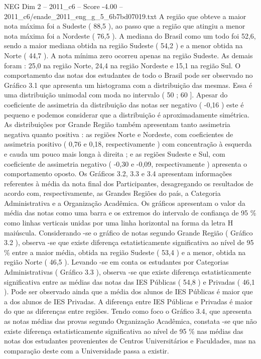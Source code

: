 \begin{textsample}{NEG Dim 2 – 2011\_c6 – Score -4.00 – 2011\_c6/enade\_2011\_eng\_g\_5\_6b7bd07019.txt}
A região que obteve a maior nota máxima foi a Sudeste ( 88,5 ), ao passo que a região que atingiu a menor nota máxima foi a Nordeste ( 76,5 ).
A mediana do Brasil como um todo foi 52,6, sendo a maior mediana obtida na região Sudeste ( 54,2 ) e a menor obtida na Norte ( 44,7 ).
A nota mínima zero ocorreu apenas na região Sudeste.
As demais foram : 25,0 na região Norte, 24,4 na região Nordeste e 15,1 na região Sul.
O comportamento das notas dos estudantes de todo o Brasil pode ser observado no Gráfico 3.1 que apresenta um histograma com a distribuição das mesmas.
Essa é uma distribuição unimodal com moda no intervalo ( 50 ; 60 ].
Apesar do coeficiente de assimetria da distribuição das notas ser negativo ( -0,16 ) este é pequeno e podemos considerar que a distribuição é aproximadamente simétrica.
As distribuições por Grande Região também apresentam tanto assimetria negativa quanto positiva : as regiões Norte e Nordeste, com coeficientes de assimetria positivo ( 0,76 e 0,18, respectivamente ) com concentração à esquerda e cauda um pouco mais longa à direita ; e as regiões Sudeste e Sul, com coeficiente de assimetria negativo ( -0,30 e -0,09, respectivamente ) apresenta o comportamento oposto.
Os Gráficos 3.2, 3.3 e 3.4 apresentam informações referentes à média da nota final dos Participantes, desagregando os resultados de acordo com, respectivamente, as Grandes Regiões do país, a Categoria Administrativa e a Organização Acadêmica.
Os gráficos apresentam o valor da média das notas como uma barra e os extremos do intervalo de confiança de 95 \% como linhas verticais unidas por uma linha horizontal na forma da letra H maiúscula.
Considerando -se o gráfico de notas segundo Grande Região ( Gráfico 3.2 ), observa -se que existe diferença estatisticamente significativa ao nível de 95 \% entre a maior média, obtida na região Sudeste ( 53,4 ) e a menor, obtida na região Norte ( 46,5 ).
Levando -se em conta os estudantes por Categorias Administrativas ( Gráfico 3.3 ), observa -se que existe diferença estatisticamente significativa entre as médias das notas das IES Públicas ( 54,8 ) e Privadas ( 46,1 ).
Pode ser observado ainda que a média dos alunos de IES Públicas é maior que a dos alunos de IES Privadas.
A diferença entre IES Públicas e Privadas é maior do que as diferenças entre regiões.
Tendo como foco o Gráfico 3.4, que apresenta as notas médias das provas segundo Organização Acadêmica, constata -se que não existe diferença estatisticamente significativa ao nível de 95 \% nas médias das notas dos estudantes provenientes de Centros Universitários e Faculdades, mas na comparação deste com a Universidade passa a existir.

\end{textsample}
